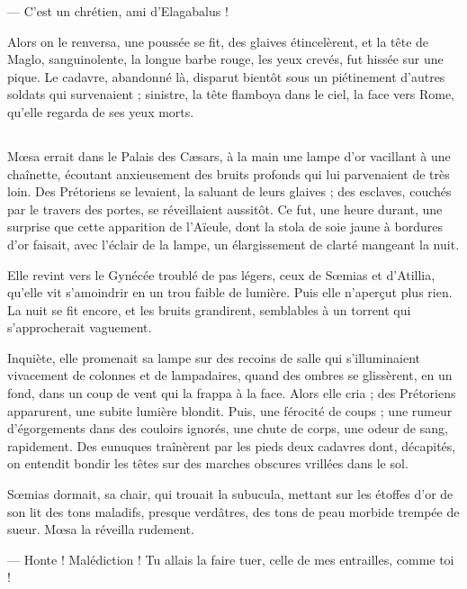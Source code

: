 \documentclass[a4paper, 11pt, oneside, polutonikogreek, french]{article}
\begin{document}
--- C'est un chrétien, ami d'Elagabalus !

Alors on le renversa, une poussée se fit, des glaives étincelèrent, et la tête de Maglo, sanguinolente, la longue barbe rouge, les yeux crevés, fut hissée sur une pique. Le cadavre, abandonné là, disparut bientôt sous un piétinement d'autres soldats qui survenaient ; sinistre, la tête flamboya dans le ciel, la face vers Rome, qu'elle regarda de ses yeux morts.
\clearpage
\subsection{}
\paragraph{}
Mœsa errait dans le Palais des Cæsars, à la main une lampe d'or vacillant à une chaînette, écoutant anxieusement des bruits profonds qui lui parvenaient de très loin. Des Prétoriens se levaient, la saluant de leurs glaives ; des esclaves, couchés par le travers des portes, se réveillaient aussitôt. Ce fut, une heure durant, une surprise que cette apparition de l'Aïeule, dont la stola de soie jaune à bordures d'or faisait, avec l'éclair de la lampe, un élargissement de clarté mangeant la nuit.

Elle revint vers le Gynécée troublé de pas légers, ceux de Sœmias et d'Atillia, qu'elle vit s'amoindrir en un trou faible de lumière. Puis elle n'aperçut plus rien. La nuit se fit encore, et les bruits grandirent, semblables à un torrent qui s'approcherait vaguement.

Inquiète, elle promenait sa lampe sur des recoins de salle qui s'illuminaient vivacement de colonnes et de lampadaires, quand des ombres se glissèrent, en un fond, dans un coup de vent qui la frappa à la face. Alors elle cria ; des Prétoriens apparurent, une subite lumière blondit. Puis, une férocité de coups ; une rumeur d'égorgements dans des couloirs ignorés, une chute de corps, une odeur de sang, rapidement. Des eunuques traînèrent par les pieds deux cadavres dont, décapités, on entendit bondir les têtes sur des marches obscures vrillées dans le sol.

Sœmias dormait, sa chair, qui trouait la subucula, mettant sur les étoffes d'or de son lit des tons maladifs, presque verdâtres, des tons de peau morbide trempée de sueur. Mœsa la réveilla rudement.

--- Honte ! Malédiction ! Tu allais la faire tuer, celle de mes entrailles, comme toi !
\end{document}
